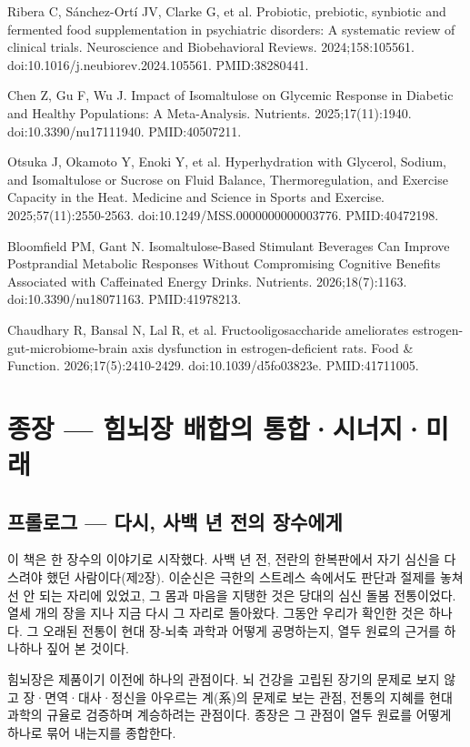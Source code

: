 \documentclass[12pt,oneside]{book}
\newcommand{\refend}{\endgroup\par}
\newcommand{\reff}[2]{\par\hangindent=7mm\hangafter=1\noindent[#1]\hspace{2mm}#2\par}
\begin{document}
\reff{34}{Ribera C, Sánchez-Ortí JV, Clarke G, et al. Probiotic, prebiotic, synbiotic and fermented food supplementation in psychiatric disorders: A systematic review of clinical trials. Neuroscience and Biobehavioral Reviews. 2024;158:105561. doi:10.1016/j.neubiorev.2024.105561. PMID:38280441.}

\reff{35}{Chen Z, Gu F, Wu J. Impact of Isomaltulose on Glycemic Response in Diabetic and Healthy Populations: A Meta-Analysis. Nutrients. 2025;17(11):1940. doi:10.3390/nu17111940. PMID:40507211.}

\reff{36}{Otsuka J, Okamoto Y, Enoki Y, et al. Hyperhydration with Glycerol, Sodium, and Isomaltulose or Sucrose on Fluid Balance, Thermoregulation, and Exercise Capacity in the Heat. Medicine and Science in Sports and Exercise. 2025;57(11):2550-2563. doi:10.1249/MSS.0000000000003776. PMID:40472198.}

\reff{37}{Bloomfield PM, Gant N. Isomaltulose-Based Stimulant Beverages Can Improve Postprandial Metabolic Responses Without Compromising Cognitive Benefits Associated with Caffeinated Energy Drinks. Nutrients. 2026;18(7):1163. doi:10.3390/nu18071163. PMID:41978213.}

\reff{38}{Chaudhary R, Bansal N, Lal R, et al. Fructooligosaccharide ameliorates estrogen-gut-microbiome-brain axis dysfunction in estrogen-deficient rats. Food \& Function. 2026;17(5):2410-2429. doi:10.1039/d5fo03823e. PMID:41711005.}

\refend


\chapter{종장 — 힘뇌장 배합의 통합·시너지·미래}

\section{프롤로그 — 다시, 사백 년 전의 장수에게}

이 책은 한 장수의 이야기로 시작했다. 사백 년 전, 전란의 한복판에서 자기 심신을 다스려야 했던 사람이다(제2장). 이순신은 극한의 스트레스 속에서도 판단과 절제를 놓쳐선 안 되는 자리에 있었고, 그 몸과 마음을 지탱한 것은 당대의 심신 돌봄 전통이었다. 열세 개의 장을 지나 지금 다시 그 자리로 돌아왔다. 그동안 우리가 확인한 것은 하나다. 그 오래된 전통이 현대 장-뇌축 과학과 어떻게 공명하는지, 열두 원료의 근거를 하나하나 짚어 본 것이다.

힘뇌장은 제품이기 이전에 하나의 관점이다. 뇌 건강을 고립된 장기의 문제로 보지 않고 장·면역·대사·정신을 아우르는 계(系)의 문제로 보는 관점, 전통의 지혜를 현대 과학의 규율로 검증하며 계승하려는 관점이다. 종장은 그 관점이 열두 원료를 어떻게 하나로 묶어 내는지를 종합한다.
\end{document}
